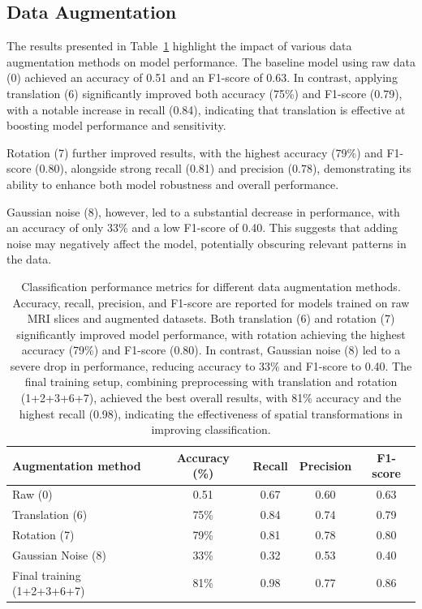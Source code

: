\subsection{Data Augmentation}

The results presented in Table~\ref{tab:model_meetrics_augmentation} highlight the impact of various data augmentation methods on model performance. The baseline model using raw data (0) achieved an accuracy of 0.51 and an F1-score of 0.63. In contrast, applying translation (6) significantly improved both accuracy (75\%) and F1-score (0.79), with a notable increase in recall (0.84), indicating that translation is effective at boosting model performance and sensitivity.

Rotation (7) further improved results, with the highest accuracy (79\%) and F1-score (0.80), alongside strong recall (0.81) and precision (0.78), demonstrating its ability to enhance both model robustness and overall performance.

Gaussian noise (8), however, led to a substantial decrease in performance, with an accuracy of only 33\% and a low F1-score of 0.40. This suggests that adding noise may negatively affect the model, potentially obscuring relevant patterns in the data.
\begin{center}
	\begin{table}[t]
		\centering
		\caption{\label{tab:model_meetrics_augmentation}Classification performance metrics for different data augmentation methods. Accuracy, recall, precision, and F1-score are reported for models trained on raw MRI slices and augmented datasets. Both translation (6) and rotation (7) significantly improved model performance, with rotation achieving the highest accuracy (79\%) and F1-score (0.80). In contrast, Gaussian noise (8) led to a severe drop in performance, reducing accuracy to 33\% and F1-score to 0.40. The final training setup, combining preprocessing with translation and rotation (1+2+3+6+7), achieved the best overall results, with 81\% accuracy and the highest recall (0.98), indicating the effectiveness of spatial transformations in improving classification.}
		\begin{tabular*}{500pt}{@{\extracolsep\fill}lcccc@{\extracolsep\fill}}
			\toprule
			\textbf{Augmentation method} &\textbf{Accuracy (\%)} &  \textbf{Recall} &\textbf{Precision} &\textbf{F1-score}\\
			\midrule
			Raw (0) & 0.51 & 0.67 & 0.60 & 0.63 \\
			Translation (6) & 75\% & 0.84 & 0.74 & 0.79 \\
			Rotation (7) & 79\% & 0.81 & 0.78 & 0.80 \\
			Gaussian Noise (8) & 33\% & 0.32 & 0.53 & 0.40 \\
            Final training (1+2+3+6+7) & 81\% & 0.98 & 0.77 & 0.86 \\
			\bottomrule
		\end{tabular*}
	\end{table}
\end{center}

